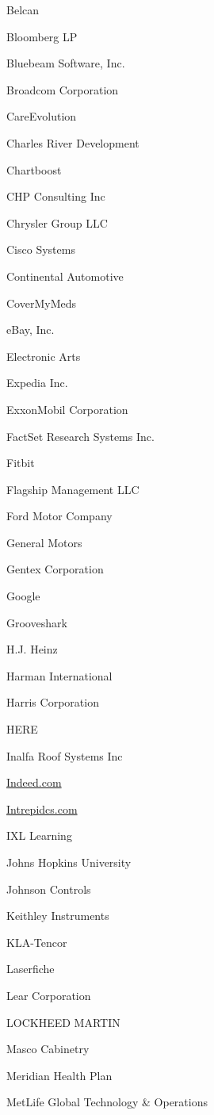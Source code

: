 \documentclass[twoside]{article}
\begin{document}
\begin{center}
\begin{multicols}{5}
\begin{FlushLeft}
\begin{compactitem}
\item Belcan
\item Bloomberg LP
\item Bluebeam Software, Inc.
\item Broadcom Corporation
\item CareEvolution
\item Charles River Development
\item Chartboost
\item CHP Consulting Inc
\item Chrysler Group LLC
\item Cisco Systems
\item Continental Automotive
\item CoverMyMeds
\item eBay, Inc.
\item Electronic Arts
\item Expedia Inc.
\item ExxonMobil Corporation
\item FactSet Research Systems Inc.
\item Fitbit
\item Flagship Management LLC
\item Ford Motor Company
\item General Motors
\item Gentex Corporation
\item Google
\item Grooveshark
\item H.J. Heinz
\item Harman International
\item Harris Corporation
\item HERE
\item Inalfa Roof Systems Inc
\item \url{Indeed.com}
\item \url{Intrepidcs.com}
\item IXL Learning
\item Johns Hopkins University
\item Johnson Controls
\item Keithley Instruments
\item KLA-Tencor
\item Laserfiche
\item Lear Corporation
\item LOCKHEED MARTIN
\item Masco Cabinetry
\item Meridian Health Plan
\item MetLife Global Technology \& Operations

\end{compactitem}
\end{FlushLeft}
\end{multicols}
\end{center}
\end{document}
